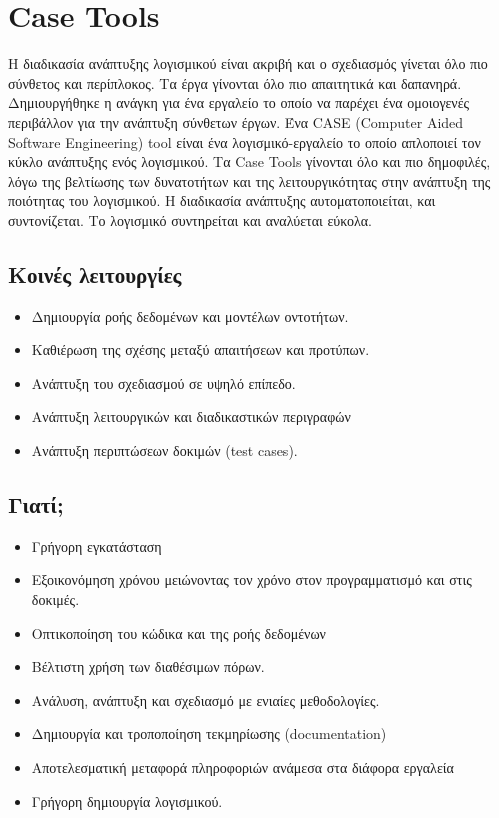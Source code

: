 \chapter{Case Tools}
	Η διαδικασία ανάπτυξης λογισμικού είναι ακριβή και ο σχεδιασμός γίνεται όλο πιο σύνθετος και περίπλοκος. Τα έργα γίνονται όλο πιο απαιτητικά και δαπανηρά. Δημιουργήθηκε η ανάγκη για ένα εργαλείο το οποίο να παρέχει ένα ομοιογενές περιβάλλον για την ανάπτυξη σύνθετων έργων. 
	Ένα CASE (Computer Aided Software Engineering) tool είναι ένα λογισμικό-εργαλείο το οποίο απλοποιεί τον κύκλο ανάπτυξης ενός λογισμικού. Τα Case Tools γίνονται όλο και πιο δημοφιλές, λόγω της βελτίωσης των δυνατοτήτων και της λειτουργικότητας στην ανάπτυξη της ποιότητας του λογισμικού. Η διαδικασία ανάπτυξης αυτοματοποιείται, και συντονίζεται. Το λογισμικό συντηρείται και αναλύεται εύκολα. 
	
	\section{Kοινές λειτουργίες}
	\begin{itemize}
	\item Δημιουργία ροής δεδομένων και μοντέλων οντοτήτων.
	\item Καθιέρωση της σχέσης μεταξύ απαιτήσεων και προτύπων.
	\item Ανάπτυξη του σχεδιασμού σε υψηλό επίπεδο.
	\item Ανάπτυξη λειτουργικών και διαδικαστικών περιγραφών
	\item Ανάπτυξη περιπτώσεων δοκιμών (test cases).	
	\end{itemize}
	
	\section{Γιατί;}
	\begin{itemize}
	\item Γρήγορη εγκατάσταση
	\item Εξοικονόμηση χρόνου μειώνοντας τον χρόνο στον προγραμματισμό και στις δοκιμές.
	\item Οπτικοποίηση του κώδικα και της ροής δεδομένων
	\item Βέλτιστη χρήση των διαθέσιμων πόρων.
	\item Ανάλυση, ανάπτυξη και σχεδιασμό με ενιαίες μεθοδολογίες.
	\item Δημιουργία και τροποποίηση τεκμηρίωσης (documentation)
	\item Αποτελεσματική μεταφορά πληροφοριών ανάμεσα στα διάφορα εργαλεία
	\item Γρήγορη δημιουργία λογισμικού.
	\end{itemize}
	
